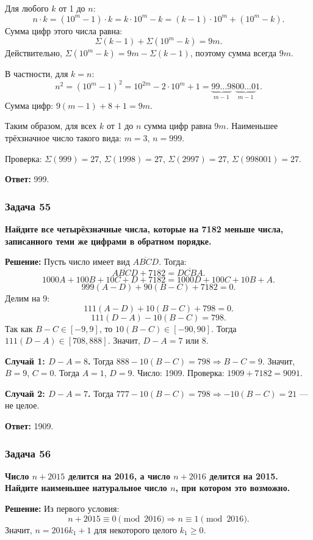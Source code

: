 \documentclass[12pt, a4paper]{article}
\begin{document}
Для любого $k$ от 1 до $n$:
\[
n \cdot k = (10^m - 1) \cdot k = k \cdot 10^m - k = (k-1) \cdot 10^m + (10^m - k).
\]
Сумма цифр этого числа равна:
\[
\Sigma(k-1) + \Sigma(10^m - k) = 9m.
\]
Действительно, $\Sigma(10^m - k) = 9m - \Sigma(k-1)$, поэтому сумма всегда $9m$.

В частности, для $k = n$:
\[
n^2 = (10^m - 1)^2 = 10^{2m} - 2 \cdot 10^m + 1 = \underbrace{99\ldots9}_{m-1}8\underbrace{00\ldots0}_{m-1}1.
\]
Сумма цифр: $9(m-1) + 8 + 1 = 9m$.

Таким образом, для всех $k$ от 1 до $n$ сумма цифр равна $9m$. Наименьшее трёхзначное число такого вида: $m = 3$, $n = 999$.

Проверка: $\Sigma(999) = 27$, $\Sigma(1998) = 27$, $\Sigma(2997) = 27$, $\Sigma(998001) = 27$.

\textbf{Ответ:} 999.

\subsubsection*{Задача 55}
\textbf{Найдите все четырёхзначные числа, которые на 7182 меньше числа, записанного теми же цифрами в обратном порядке.}

\textbf{Решение:}
Пусть число имеет вид $\overline{ABCD}$. Тогда:
\[
\overline{ABCD} + 7182 = \overline{DCBA}.
\]
\[
1000A + 100B + 10C + D + 7182 = 1000D + 100C + 10B + A.
\]
\[
999(A-D) + 90(B-C) + 7182 = 0.
\]
Делим на 9:
\[
111(A-D) + 10(B-C) + 798 = 0.
\]
\[
111(D-A) - 10(B-C) = 798.
\]
Так как $B-C \in [-9, 9]$, то $10(B-C) \in [-90, 90]$. Тогда $111(D-A) \in [708, 888]$. Значит, $D-A = 7$ или $8$.

\textbf{Случай 1: $D-A = 8$.} Тогда $888 - 10(B-C) = 798 \Rightarrow B-C = 9$. Значит, $B=9$, $C=0$. Тогда $A=1$, $D=9$. Число: 1909. Проверка: $1909 + 7182 = 9091$.

\textbf{Случай 2: $D-A = 7$.} Тогда $777 - 10(B-C) = 798 \Rightarrow -10(B-C) = 21$ — не целое.

\textbf{Ответ:} 1909.

\subsubsection*{Задача 56}
\textbf{Число $n + 2015$ делится на 2016, а число $n + 2016$ делится на 2015. Найдите наименьшее натуральное число $n$, при котором это возможно.}

\textbf{Решение:}
Из первого условия:
\[
n + 2015 \equiv 0 \pmod{2016} \Rightarrow n \equiv 1 \pmod{2016}.
\]
Значит, $n = 2016k_1 + 1$ для некоторого целого $k_1 \ge 0$.
\end{document}
